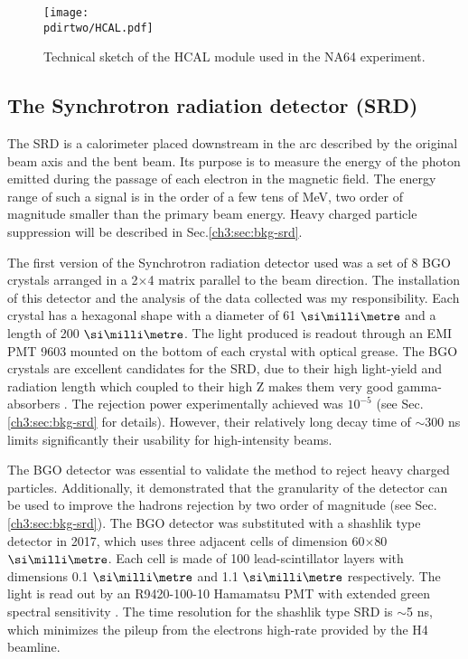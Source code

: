 \begin{figure}[bth!]
\centering
\texttt{[image: \\pdirtwo/HCAL.pdf]}
\caption[HCAL sketch]{Technical sketch of the HCAL module used in the NA64 experiment.}
\label{fig:hcal-sketch}
\end{figure}

\subsection{The Synchrotron radiation detector (SRD)}
\label{ch2:sec:detectors-srd}

The SRD is a calorimeter placed downstream in the arc described by the original beam axis and the bent beam. Its purpose is to measure the energy of the photon emitted during the passage of each electron in the magnetic field. The energy range of such a signal is in the order of a few tens of MeV, two order of magnitude smaller than the primary beam energy. Heavy charged particle suppression will be described in Sec.\ref{ch3:sec:bkg-srd}.

The first version of the Synchrotron radiation detector used was a set of 8 BGO crystals arranged in a 2$\times$4 matrix parallel to the beam direction. The installation of this detector and the analysis of the data collected was my responsibility. Each crystal has a hexagonal shape with a diameter of 61 $\mmi$ and a length of 200 $\mmi$. The light produced is readout through an EMI PMT 9603 mounted on the bottom of each crystal with optical grease. The BGO crystals are excellent candidates for the SRD, due to their high light-yield and radiation length which coupled to their high Z makes them very good gamma-absorbers \cite{bgo-crystal}. The rejection power experimentally achieved was $10^{-5}$ (see Sec.\ref{ch3:sec:bkg-srd} for details). However, their relatively long decay time of $\sim$300 \si{ns} limits significantly their usability for high-intensity beams.

The BGO detector was essential to validate the method to reject heavy charged particles. Additionally, it demonstrated that the granularity of the detector can be used to improve the hadrons rejection by two order of magnitude (see Sec.\ref{ch3:sec:bkg-srd}). The BGO detector was substituted with a shashlik type detector in 2017, which uses three adjacent cells of dimension 60$\times$80 $\mmi$. Each cell is made of 100 lead-scintillator layers with dimensions 0.1 $\mmi$ and 1.1 $\mmi$ respectively. The light is read out by an R9420-100-10 Hamamatsu PMT with extended green spectral sensitivity \cite{hamamatsu-R9420-100-10}. The time resolution for the shashlik type SRD is $\sim$5 \si{ns}, which minimizes the pileup from the electrons high-rate provided by the H4 beamline.

